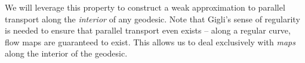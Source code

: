 \documentclass[11pt]{article}
\newcommand{\man}{\mathcal{M}}
\begin{document}
We will leverage this property to construct a weak approximation to parallel transport along the \textit{interior} of any geodesic. Note that Gigli's sense of regularity is needed to ensure that parallel transport even exists -- along a regular curve, flow maps are guaranteed to exist. This allows us to deal exclusively with \textit{maps} along the interior of the geodesic. 

\end{document}

